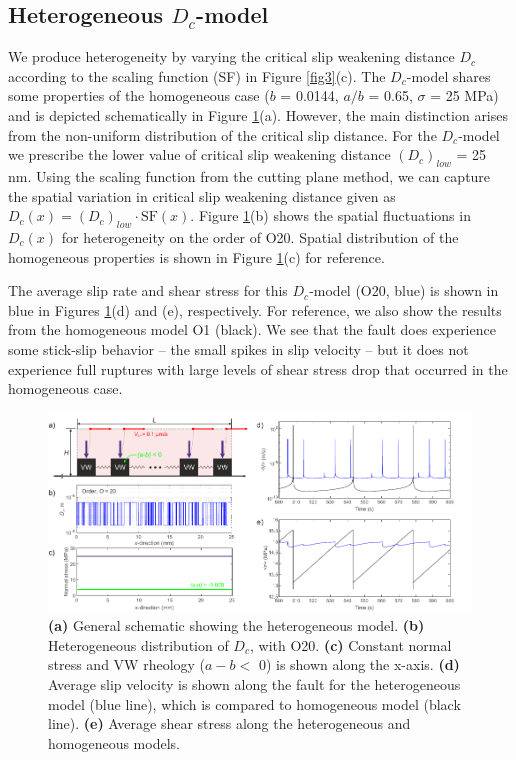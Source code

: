 \documentclass[draft]{agujournal2019}
\begin{document}
\subsection{Heterogeneous $D_{c}$-model}

We produce heterogeneity by varying the critical slip weakening distance $D_{c}$ according to the scaling function (SF) in Figure \ref{fig3}(c). The $D_{c}$-model shares some properties of the homogeneous case ($b$ = 0.0144, $a/b$ = 0.65, $\sigma$ = 25 MPa) and is depicted schematically in Figure \ref{fig6}(a).  However, the main distinction arises from the non-uniform distribution of the critical slip distance. For the $D_{c}$-model we prescribe the lower value of critical slip weakening distance $(D_{c})_{low}$ = 25 nm. Using the scaling function from the cutting plane method, we can capture the spatial variation in critical slip weakening distance given as $D_{c}(x) = (D_{c})_{low} \cdot \mathrm{SF}(x)$. Figure \ref{fig6}(b) shows the spatial fluctuations in $D_{c}(x)$ for heterogeneity on the order of O20. Spatial distribution of the homogeneous properties is shown in Figure \ref{fig6}(c) for reference.
 
The average slip rate and shear stress for this $D_{c}$-model (O20, blue) is shown in blue in Figures \ref{fig6}(d) and (e), respectively. For reference, we also show the results from the homogeneous model O1 (black). We see that the fault does experience some stick-slip behavior -- the small spikes in slip velocity -- but it does not experience full ruptures with large levels of shear stress drop that occurred in the homogeneous case. 

 \begin{figure}
	\centering
	\includegraphics{FIG6.pdf} 
	\caption{\textbf{(a)} General schematic showing the heterogeneous model. \textbf{(b)} Heterogeneous distribution of $D_{c}$, with O20. \textbf{(c)} Constant normal stress and VW rheology ($a-b <$ 0) is shown along the x-axis.  \textbf{(d)} Average slip velocity is shown along the fault for the heterogeneous model (blue line), which is compared to homogeneous model (black line). \textbf{(e)} Average shear stress along the heterogeneous and homogeneous models.}
	\label{fig6}
\end{figure}
 
\end{document}

